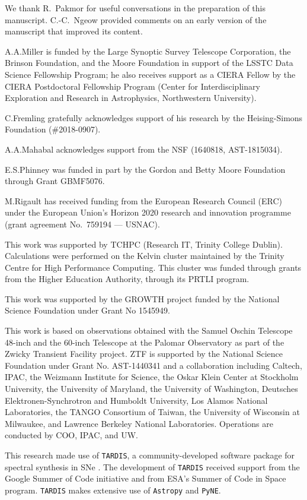 \documentclass[twocolumn]{aastex63}
\begin{document}
We thank R.~Pakmor for useful conversations in the preparation of this
manuscript. C.-C.~Ngeow provided comments on an early version of the
manuscript that improved its content.

A.A.Miller is funded by the Large Synoptic Survey Telescope Corporation, the
Brinson Foundation, and the Moore Foundation in support of the LSSTC Data
Science Fellowship Program; he also receives support as a CIERA Fellow by the
CIERA Postdoctoral Fellowship Program (Center for Interdisciplinary
Exploration and Research in Astrophysics, Northwestern University).

C.Fremling gratefully acknowledges support of his research by the
Heising-Simons Foundation (\#2018-0907).

A.A.Mahabal acknowledges support from the NSF (1640818, AST-1815034).

E.S.Phinney was funded in part by the Gordon and Betty Moore Foundation
through Grant GBMF5076.

M.Rigault has received funding from the European Research Council (ERC) under
the European Union’s Horizon 2020 research and innovation programme (grant
agreement No.\ 759194 — USNAC).

This work was supported by TCHPC (Research IT, Trinity College Dublin).
Calculations were performed on the Kelvin cluster maintained by the Trinity
Centre for High Performance Computing. This cluster was funded through grants
from the Higher Education Authority, through its PRTLI program.

This work was supported by the GROWTH project funded by the National Science
Foundation under Grant No 1545949.

This work is based on observations obtained with the Samuel Oschin Telescope
48-inch and the 60-inch Telescope at the Palomar Observatory as part of the
Zwicky Transient Facility project. ZTF is supported by the National Science
Foundation under Grant No. AST-1440341 and a collaboration including Caltech,
IPAC, the Weizmann Institute for Science, the Oskar Klein Center at Stockholm
University, the University of Maryland, the University of Washington,
Deutsches Elektronen-Synchrotron and Humboldt University, Los Alamos National
Laboratories, the TANGO Consortium of Taiwan, the University of Wisconsin at
Milwaukee, and Lawrence Berkeley National Laboratories. Operations are
conducted by COO, IPAC, and UW.

This research made use of \texttt{TARDIS}, a community-developed software
package for spectral synthesis in SNe \citep{Kerzendorf14}. The development of
\texttt{TARDIS} received support from the Google Summer of Code initiative and
from ESA's Summer of Code in Space program. \texttt{TARDIS} makes extensive
use of \texttt{Astropy} and \texttt{PyNE}.
\end{document}
